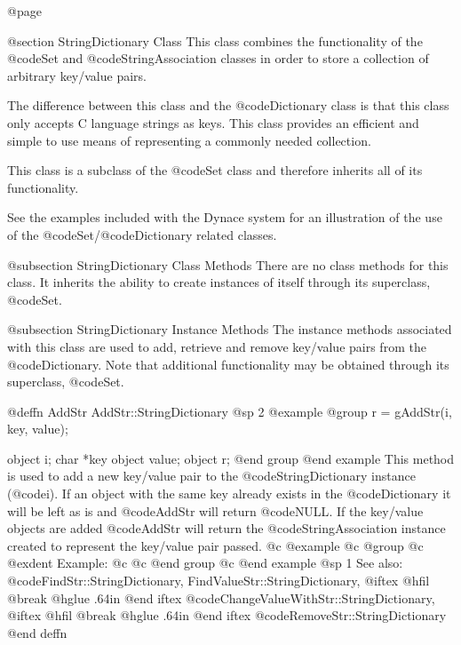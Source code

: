 @page

@section StringDictionary Class
This class combines the functionality of the @code{Set}
and @code{StringAssociation} classes in order to store a collection of
arbitrary key/value pairs.

The difference between this class and the @code{Dictionary} class is
that this class only accepts C language strings as keys.  This class
provides an efficient and simple to use means of representing a
commonly needed collection.

This class is a subclass of the @code{Set} class and therefore inherits
all of its functionality.

See the examples included with the Dynace system for an illustration of the
use of the @code{Set}/@code{Dictionary} related classes.


@subsection StringDictionary Class Methods
There are no class methods for this class.  It inherits the ability
to create instances of itself through its superclass, @code{Set}.



@subsection StringDictionary Instance Methods
The instance methods associated with this class are used to add, retrieve
and remove key/value pairs from the @code{Dictionary}.  Note that additional
functionality may be obtained through its superclass, @code{Set}.






@deffn {AddStr} AddStr::StringDictionary
@sp 2
@example
@group
r = gAddStr(i, key, value);

object  i;
char    *key
object  value;
object  r;
@end group
@end example
This method is used to add a new key/value pair to the @code{StringDictionary}
instance (@code{i}).  If an object with the same key already exists in
the @code{Dictionary} it will be left as is and @code{AddStr} will return
@code{NULL}.  If the key/value objects are added @code{AddStr} will
return the @code{StringAssociation} instance created to represent the
key/value pair passed.
@c @example
@c @group
@c @exdent Example:
@c 
@c @end group
@c @end example
@sp 1
See also:  @code{FindStr::StringDictionary, FindValueStr::StringDictionary,}
@iftex
@hfil @break @hglue .64in      
@end iftex
@code{ChangeValueWithStr::StringDictionary,}
@iftex
@hfil @break @hglue .64in      
@end iftex
@code{RemoveStr::StringDictionary}
@end deffn










